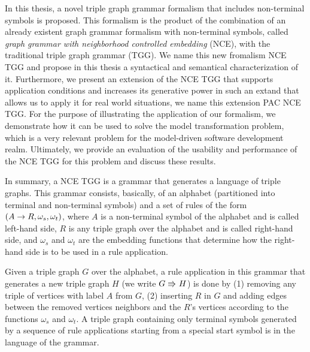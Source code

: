 In this thesis, a novel triple graph grammar formalism that includes non-terminal symbols is proposed. This formalism is the product of the combination of an already existent graph grammar formalism with non-terminal symbols, called \emph{graph grammar with neighborhood controlled embedding} (NCE), with the traditional triple graph grammar (TGG). We name this new fromalism NCE TGG and propose in this thesis a syntactical and semantical characterization of it. Furthermore, we present an extension of the NCE TGG that supports application conditions and increases its generative power in such an extand that allows us to apply it for real world situations, we name this extension PAC NCE TGG. For the purpose of illustrating the application of our formalism, we demonstrate how it can be used to solve the model transformation problem, which is a very relevant problem for the model-driven software development realm. Ultimately, we provide an evaluation of the usability and performance of the NCE TGG for this problem and discuss these results.

In summary, a NCE TGG is a grammar that generates a language of triple graphs. This grammar consists, basically, of an alphabet (partitioned into terminal and non-terminal symbols) and a set of rules of the form $(A \to R,\omega_s,\omega_t)$, where $A$ is a non-terminal symbol of the alphabet and is called left-hand side, $R$ is any triple graph over the alphabet and is called right-hand side, and $\omega_s$ and $\omega_t$ are the embedding functions that determine how the right-hand side is to be used in a rule application.

Given a triple graph $G$ over the alphabet, a rule application in this grammar that generates a new triple graph $H$ (we write $G \tcderiv{}{}{} H$) is done by (1) removing any triple of vertices with label $A$ from $G$, (2) inserting $R$ in $G$ and adding edges between the removed vertices neighbors and the $R$'s vertices according to the functions $\omega_s$ and $\omega_t$. A triple graph containing only terminal symbols generated by a sequence of rule applications starting from a special start symbol is in the language of the grammar.

